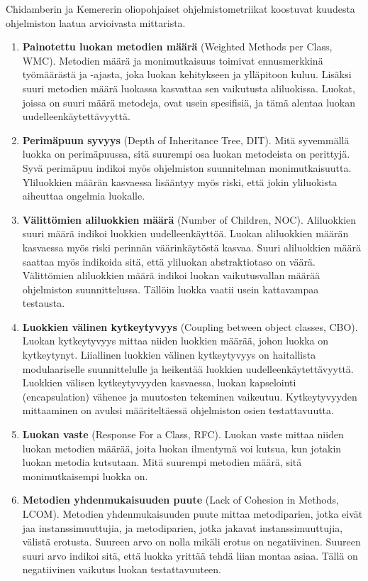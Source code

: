 \documentclass[finnish]{tktltiki2}
\theoremstyle{definition}
\theoremstyle{remark}
\begin{document}
Chidamberin ja Kemererin oliopohjaiset ohjelmistometriikat koostuvat kuudesta ohjelmiston laatua arvioivasta mittarista.

\begin{enumerate}
    \item \textbf{Painotettu luokan metodien määrä} (Weighted Methods per Class, WMC). Metodien määrä ja monimutkaisuus toimivat ennusmerkkinä työmäärästä ja -ajasta, joka luokan kehitykseen ja ylläpitoon kuluu. Lisäksi suuri metodien määrä luokassa kasvattaa sen vaikutusta aliluokissa. Luokat, joissa on suuri määrä metodeja, ovat usein spesifisiä, ja tämä alentaa luokan uudelleenkäytettävyyttä.

    \item \textbf{Perimäpuun syvyys} (Depth of Inheritance Tree, DIT). Mitä syvemmällä luokka on perimäpuussa, sitä suurempi osa luokan metodeista on perittyjä. Syvä perimäpuu indikoi myös ohjelmiston suunnitelman monimutkaisuutta. Yliluokkien määrän kasvaessa lisääntyy myös riski, että jokin yliluokista aiheuttaa ongelmia luokalle.

    \item \textbf{Välittömien aliluokkien määrä} (Number of Children, NOC). Aliluokkien suuri määrä indikoi luokkien uudelleenkäyttöä. Luokan aliluokkien määrän kasvaessa myös riski perinnän väärinkäytöstä kasvaa. Suuri aliluokkien määrä saattaa myös indikoida sitä, että yliluokan abstraktiotaso on väärä. Välittömien aliluokkien määrä indikoi luokan vaikutusvallan määrää ohjelmiston suunnittelussa. Tällöin luokka vaatii usein kattavampaa testausta.

    \item \textbf{Luokkien välinen kytkeytyvyys} (Coupling between object classes, CBO). Luokan kytkeytyvyys mittaa niiden luokkien määrää, johon luokka on kytkeytynyt. Liiallinen luokkien välinen kytkeytyvyys on haitallista modulaariselle suunnittelulle ja heikentää luokkien uudelleenkäytettävyyttä. Luokkien välisen kytkeytyvyyden kasvaessa, luokan kapselointi (encapsulation) vähenee ja muutosten tekeminen vaikeutuu. Kytkeytyvyyden mittaaminen on avuksi määriteltäessä ohjelmiston osien testattavuutta.

    \item \textbf{Luokan vaste} (Response For a Class, RFC). Luokan vaste mittaa niiden luokan metodien määrää, joita luokan ilmentymä voi kutsua, kun jotakin luokan metodia kutsutaan. Mitä suurempi metodien määrä, sitä monimutkaisempi luokka on.

    \item \textbf{Metodien yhdenmukaisuuden puute} (Lack of Cohesion in Methods, LCOM). Metodien yhdenmukaisuuden puute mittaa metodiparien, jotka eivät jaa instanssimuuttujia, ja metodiparien, jotka jakavat instanssimuuttujia, välistä erotusta. Suureen arvo on nolla mikäli erotus on negatiivinen. Suureen suuri arvo indikoi sitä, että luokka yrittää tehdä liian montaa asiaa. Tällä on negatiivinen vaikutus luokan testattavuuteen.
\end{enumerate}
\end{document}
